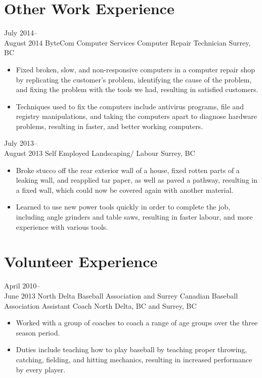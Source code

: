 \documentclass[]{friggeri-cv} %
\begin{document}
\section{Other Work Experience}

\begin{entrylist}

\entry
{July 2014--\\August 2014}
{ByteCom Computer Services {\normalfont Computer Repair Technician}}
{Surrey, BC}
{
\begin{itemize}
\item Fixed broken, slow, and non-responsive computers in a computer repair shop
by replicating the customer’s problem, identifying the cause of the problem, and
fixing the problem with the tools we had, resulting in satisfied customers.
\item Techniques used to fix the computers include antivirus programs, file and
registry manipulations, and taking the computers apart to diagnose hardware
problems, resulting in faster, and better working computers.
\end{itemize}
}

\entry
{July 2013--\\August 2013}
{Self Employed {\normalfont Landscaping/ Labour}}
{Surrey, BC}
{
\begin{itemize}
\item Broke stucco off the rear exterior wall of a house, fixed rotten parts of
a leaking wall, and reapplied tar paper, as well as paved a pathway, resulting
in a fixed wall, which could now be covered again with another material.
\item Learned to use new power tools quickly in order to complete the job,
including angle grinders and table saws, resulting in faster labour, and more
experience with various tools.
\end{itemize}
}
\end{entrylist}

\section{Volunteer Experience}

\begin{entrylist}

\entry
{April 2010--\\June 2013}
{North Delta Baseball Association and Surrey Canadian Baseball Association {\normalfont Assistant Coach}}
{North Delta, BC and Surrey, BC}
{
\begin{itemize}
\item Worked with a group of coaches to coach a range of age groups over the
three season period.
\item Duties include teaching how to play baseball by teaching proper throwing,
catching, fielding, and hitting
mechanics, resulting in increased performance by every player.
\end{itemize}
}
\end{entrylist}
\end{document}
